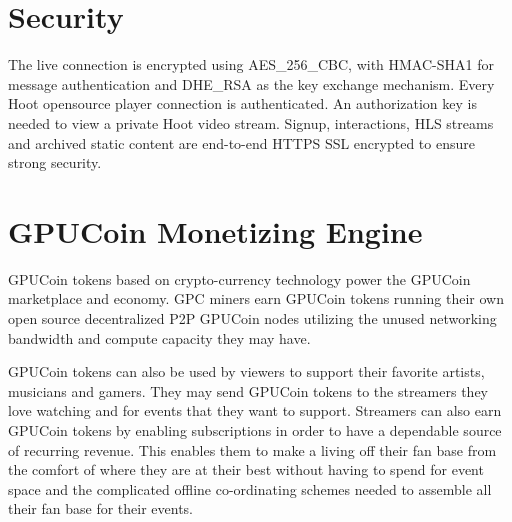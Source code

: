 \documentclass{article}
\begin{document}




\section{Security}
The live connection is encrypted using AES\_256\_CBC, with HMAC-SHA1 for message authentication and DHE\_RSA as the key exchange mechanism. Every Hoot opensource player connection is authenticated.
An authorization key is needed to view a private Hoot video stream. Signup, interactions, HLS streams and archived static content are end-to-end HTTPS SSL encrypted to ensure strong security. 

\section{GPUCoin Monetizing Engine}
GPUCoin tokens based on crypto-currency technology power the GPUCoin marketplace and economy. GPC miners earn GPUCoin tokens running their own open source decentralized P2P GPUCoin nodes utilizing the unused networking bandwidth and compute capacity they may have. 

 GPUCoin tokens can also be used by viewers to support their favorite artists, musicians and gamers. They may send GPUCoin tokens to the streamers they love watching and for events that they want to support. Streamers can also earn GPUCoin tokens by enabling subscriptions in order to have a dependable source of recurring revenue. This enables them to make a living off their fan base from the comfort of where they are at their best without having to spend for event space and the complicated offline co-ordinating schemes needed to assemble all their fan base for their events.
\end{document}

